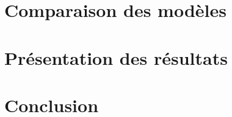 \documentclass{article}
\begin{document}
    \section{Comparaison des modèles}

    \section{Présentation des résultats}

    \section{Conclusion}
\end{document}
